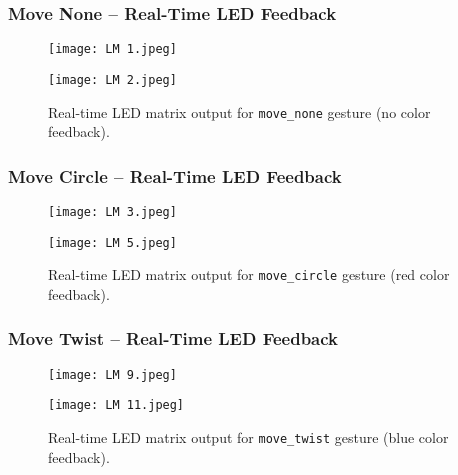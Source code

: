 \documentclass[a4paper,12pt]{article}
\begin{document}
\subsubsection*{Move None – Real-Time LED Feedback}

\begin{figure}[H]
    \centering
    \begin{minipage}[b]{0.45\linewidth}
        \centering
        \texttt{[image: LM 1.jpeg]}
    \end{minipage}
    \hfill
    \begin{minipage}[b]{0.45\linewidth}
        \centering
        \texttt{[image: LM 2.jpeg]}
    \end{minipage}
    \caption{Real-time LED matrix output for \texttt{move\_none} gesture (no color feedback).}
    \label{fig:move_none_live}
\end{figure}

\subsubsection*{Move Circle – Real-Time LED Feedback}

\begin{figure}[H]
    \centering
    \begin{minipage}[b]{0.48\linewidth}
        \centering
        \texttt{[image: LM 3.jpeg]}
    \end{minipage}
    \hfill
    \begin{minipage}[b]{0.48\linewidth}
        \centering
        \texttt{[image: LM 5.jpeg]}
    \end{minipage}
    \caption{Real-time LED matrix output for \texttt{move\_circle} gesture (red color feedback).}
    \label{fig:move_circle_live}
\end{figure}

\subsubsection*{Move Twist – Real-Time LED Feedback}

\begin{figure}[H]
    \centering
    \begin{minipage}[b]{0.45\linewidth}
        \centering
        \texttt{[image: LM 9.jpeg]}
    \end{minipage}
    \hfill
    \begin{minipage}[b]{0.45\linewidth}
        \centering
        \texttt{[image: LM 11.jpeg]}
    \end{minipage}
    \caption{Real-time LED matrix output for \texttt{move\_twist} gesture (blue color feedback).}
    \label{fig:move_twist_live}
\end{figure}
\end{document}
